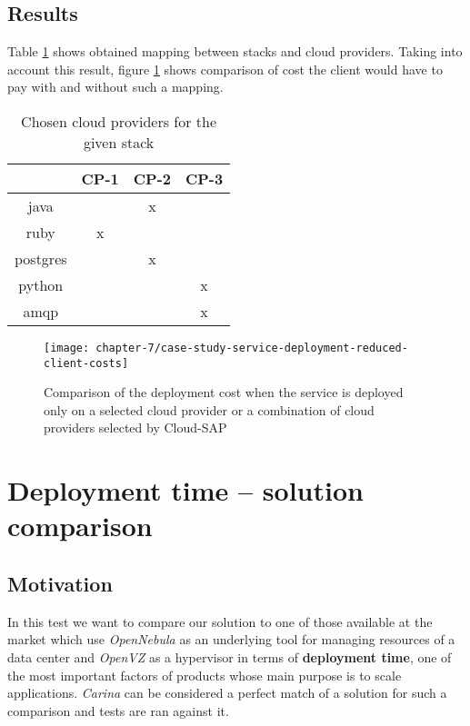 \subsection{Results}
Table \ref{tbl:test-service-deployment-cost-mapping} shows obtained mapping between stacks and cloud providers. Taking into account this result, figure \ref{ch7:service-deployment-cost} shows comparison of cost the client would have to pay with and without such a mapping.

\begin{table}
  \centering
  \begin{tabular}{ | c | c | c | c | }
    \hline                        
    & CP-1 & CP-2 & CP-3 \\
    \hline
    java      & & x & \\
    ruby      & x & & \\
    postgres  & & x & \\
    python    & & & x \\
    amqp      & & & x \\
    \hline  
  \end{tabular}
  \caption{Chosen cloud providers for the given stack}
  \label{tbl:test-service-deployment-cost-mapping}
\end{table}

\begin{figure}[!ht]
  \begin{center}
    \texttt{[image: chapter-7/case-study-service-deployment-reduced-client-costs]}
  \end{center}
  \caption{Comparison of the deployment cost when the service is deployed only on a selected cloud provider or a combination of cloud providers selected by Cloud-SAP}
  \label{ch7:service-deployment-cost}
\end{figure}

\section{Deployment time -- solution comparison}
\subsection{Motivation}
In this test we want to compare our solution to one of those available at the market which use \emph{OpenNebula} as an underlying tool for managing resources of a data center and \emph{OpenVZ} as a hypervisor in terms of \textbf{deployment time}, one of the most important factors of products whose main purpose is to scale applications.
\emph{Carina} \cite{Carina} can be considered a perfect match of a solution for such a comparison and tests are ran against it.
